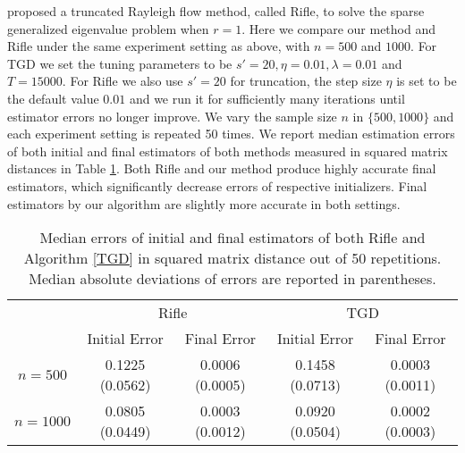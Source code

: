 \documentclass[11pt]{article}
\newcommand{\nb}[1]{\textcolor{orange}{\texttt{[#1]}}}
\newcommand{\gsc}[1]{\textcolor{blue}{\texttt{[#1]}}}
\newcommand{\0}{{\mathbf{0}}}
\begin{document}
\citet{tan2018sparse} proposed a truncated Rayleigh flow method, called Rifle, to solve the sparse generalized eigenvalue problem when $r=1$. 
Here we compare our method and Rifle under the same experiment setting as above, with $n = 500$ and $1000$. 
{For TGD we set the tuning parameters to be $s'=20, \eta = 0.01, \lambda = 0.01$ and $T = 15000$. For Rifle we also use $s'=20$ for truncation, the step size $\eta$ is set to be the default value $0.01$ and we run it for sufficiently many iterations until estimator errors no longer improve.}
We vary the sample size $n$ in $\{500, 1000\}$ and each experiment setting is repeated 50 times. 
We report median estimation errors of both initial and final estimators of both methods measured in squared matrix distances in Table \ref{simgca_rilfe}. 
{Both Rifle and our method produce highly accurate final estimators, which significantly decrease errors of respective initializers. 
Final estimators by our algorithm are slightly more accurate in both settings.}


\begin{table}[!tb]
\centering
\begin{tabular}{c|cc|cc}
\hline
\multirow{2}{*}{} & \multicolumn{2}{c|}{Rifle} & \multicolumn{2}{c}{TGD} \\ \cline{2-5} 
 & Initial Error & Final Error & Initial Error & Final Error \\ \hline
$n=500$ & 0.1225 (0.0562) & 0.0006 (0.0005) & 0.1458 (0.0713) & 0.0003 (0.0011) \\ \cline{1-1}
$n=1000$ & 0.0805 (0.0449) & 0.0003 (0.0012) & 0.0920 (0.0504) & 0.0002 (0.0003) \\ \hline
\end{tabular}
\caption{
Median errors of initial and final estimators of both Rifle and Algorithm \ref{TGD} in squared matrix distance out of 50 repetitions. 
Median absolute deviations of errors are reported in parentheses.
}
\label{simgca_rilfe}
\end{table}
\end{document}
